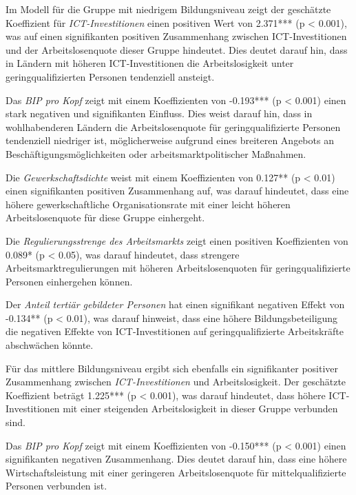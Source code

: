 

Im Modell für die Gruppe mit niedrigem Bildungsniveau zeigt der geschätzte Koeffizient 
für \textit{\ac{ICT}-Investitionen} einen positiven Wert von 2.371*** (p < 0.001), was auf 
einen signifikanten positiven Zusammenhang zwischen \ac{ICT}-Investitionen und der 
Arbeitslosenquote dieser Gruppe hindeutet. Dies deutet darauf hin, dass in Ländern mit 
höheren \ac{ICT}-Investitionen die Arbeitslosigkeit unter geringqualifizierten Personen 
tendenziell ansteigt.

Das \textit{\ac{BIP} pro Kopf} zeigt mit einem Koeffizienten von -0.193*** (p < 0.001) 
einen stark negativen und signifikanten Einfluss. Dies weist darauf hin, dass in wohlhabenderen 
Ländern die Arbeitslosenquote für geringqualifizierte Personen tendenziell niedriger ist, 
möglicherweise aufgrund eines breiteren Angebots an Beschäftigungsmöglichkeiten oder 
arbeitsmarktpolitischer Maßnahmen.

Die \textit{Gewerkschaftsdichte} weist mit einem Koeffizienten von 0.127** (p < 0.01) einen 
signifikanten positiven Zusammenhang auf, was darauf hindeutet, dass eine höhere 
gewerkschaftliche Organisationsrate mit einer leicht höheren Arbeitslosenquote für diese Gruppe 
einhergeht.

Die \textit{Regulierungsstrenge des Arbeitsmarkts} zeigt einen positiven Koeffizienten von 0.089* 
(p < 0.05), was darauf hindeutet, dass strengere Arbeitsmarktregulierungen mit höheren 
Arbeitslosenquoten für geringqualifizierte Personen einhergehen können.

Der \textit{Anteil tertiär gebildeter Personen} hat einen signifikant negativen Effekt von -0.134** 
(p < 0.01), was darauf hinweist, dass eine höhere Bildungsbeteiligung die negativen Effekte von 
\ac{ICT}-Investitionen auf geringqualifizierte Arbeitskräfte abschwächen könnte.

Für das mittlere Bildungsniveau ergibt sich ebenfalls ein signifikanter positiver Zusammenhang 
zwischen \textit{\ac{ICT}-Investitionen} und Arbeitslosigkeit. Der geschätzte Koeffizient beträgt 
1.225*** (p < 0.001), was darauf hindeutet, dass höhere \ac{ICT}-Investitionen mit einer steigenden 
Arbeitslosigkeit in dieser Gruppe verbunden sind.

Das \textit{\ac{BIP} pro Kopf} zeigt mit einem Koeffizienten von -0.150*** (p < 0.001) einen 
signifikanten negativen Zusammenhang. Dies deutet darauf hin, dass eine höhere 
Wirtschaftsleistung mit einer geringeren Arbeitslosenquote für mittelqualifizierte Personen 
verbunden ist.

